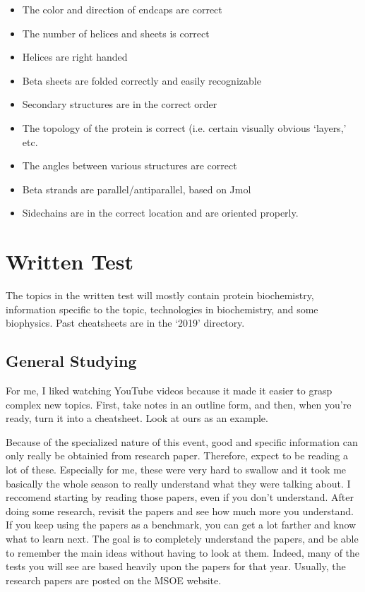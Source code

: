\documentclass[twocolumn]{article}
\begin{document}
\begin{itemize}
\item The color and direction of endcaps are correct
\item The number of helices and sheets is correct
\item Helices are right handed
\item Beta sheets are folded correctly and easily recognizable
\item Secondary structures are in the correct order
\item The topology of the protein is correct (i.e. certain visually obvious `layers,' etc. 
\item The angles between various structures are correct
\item Beta strands are parallel/antiparallel, based on Jmol
\item Sidechains are in the correct location and are oriented properly. 
\end{itemize}


\section{Written Test}
The topics in the written test will mostly contain protein biochemistry, information specific to the topic, technologies in biochemistry, and some biophysics. Past cheatsheets are in the `2019' directory. 
\subsection{General Studying}
For me, I liked watching YouTube videos because it made it easier to grasp complex new topics. First, take notes in an outline form, and then, when you're ready, turn it into a cheatsheet. Look at ours as an example. 

Because of the specialized nature of this event, good and specific information can only really be obtainied from research paper. Therefore, expect to be reading a lot of these. Especially for me, these were very hard to swallow and it took me basically the whole season to really understand what they were talking about. I reccomend starting by reading those papers, even if you don't understand. After doing some research, revisit the papers and see how much more you understand. If you keep using the papers as a benchmark, you can get a lot farther and know what to learn next. The goal is to completely understand the papers, and be able to remember the main ideas without having to look at them. Indeed, many of the tests you will see are based heavily upon the papers for that year. Usually, the research papers are posted on the MSOE website. 
\end{document}
